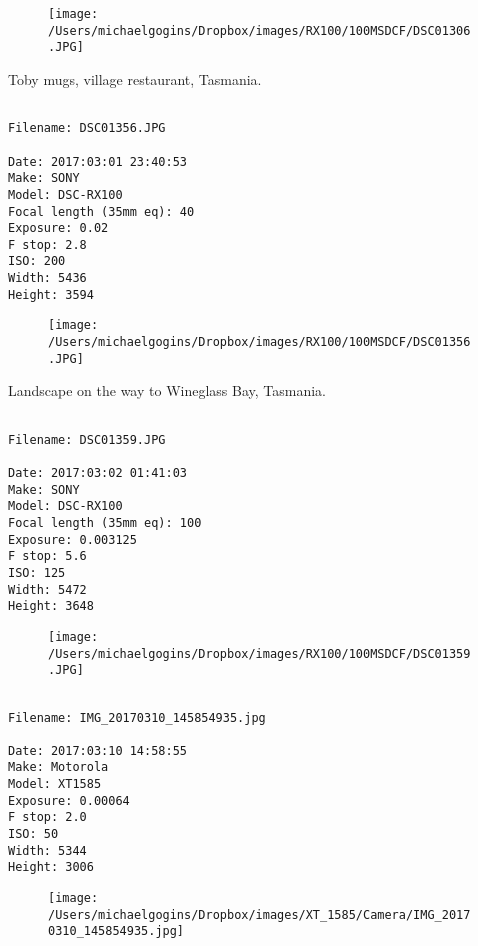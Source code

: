 \documentclass[11pt,letter,DIV=14,paper=landscape]{scrbook}
\begin{document}
\begin{figure}
\texttt{[image: /Users/michaelgogins/Dropbox/images/RX100/100MSDCF/DSC01306.JPG]}
\end{figure}
    
\clearpage
\noindent Toby mugs, village restaurant, Tasmania.
\noindent
\begin{lstlisting}

Filename: DSC01356.JPG

Date: 2017:03:01 23:40:53
Make: SONY
Model: DSC-RX100
Focal length (35mm eq): 40
Exposure: 0.02
F stop: 2.8
ISO: 200
Width: 5436
Height: 3594
\end{lstlisting}
\clearpage

\begin{figure}
\texttt{[image: /Users/michaelgogins/Dropbox/images/RX100/100MSDCF/DSC01356.JPG]}
\end{figure}
    
\clearpage
\noindent Landscape on the way to Wineglass Bay, Tasmania.
\noindent
\begin{lstlisting}

Filename: DSC01359.JPG

Date: 2017:03:02 01:41:03
Make: SONY
Model: DSC-RX100
Focal length (35mm eq): 100
Exposure: 0.003125
F stop: 5.6
ISO: 125
Width: 5472
Height: 3648
\end{lstlisting}
\clearpage

\begin{figure}
\texttt{[image: /Users/michaelgogins/Dropbox/images/RX100/100MSDCF/DSC01359.JPG]}
\end{figure}
    
\clearpage
\noindent 
\noindent
\begin{lstlisting}

Filename: IMG_20170310_145854935.jpg

Date: 2017:03:10 14:58:55
Make: Motorola
Model: XT1585
Exposure: 0.00064
F stop: 2.0
ISO: 50
Width: 5344
Height: 3006
\end{lstlisting}
\clearpage

\begin{figure}
\texttt{[image: /Users/michaelgogins/Dropbox/images/XT\_1585/Camera/IMG\_20170310\_145854935.jpg]}
\end{figure}
    
\end{document}
